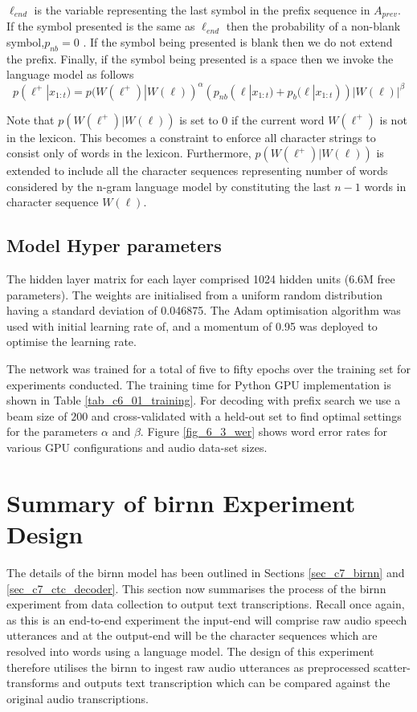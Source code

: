 $\ell_{end}$ is the variable representing the last symbol in the prefix sequence in $A_{prev}$. If the symbol presented is the same as $\ell_{end}$ then the probability of a non-blank symbol,$p_{nb}=0$ . If the symbol being presented is blank then we do not extend the prefix.  Finally, if the symbol being presented is a space then we invoke the language model as follows
\begin{equation}
p(\ell^+|x_{1:t})=p(W(\ell^+)|W(\ell))^\alpha(p_{nb}(\ell|x_{1:t})+p_b(\ell|x_{1:t}))|W(\ell)|^\beta
\label{eqn_c6_decoder03}
\end{equation}

Note that $p(W(\ell^+)|W(\ell))$ is set to $0$ if the current word $W(\ell^+)$ is not in the lexicon. This becomes a constraint to enforce all character strings to consist only of words in the lexicon.  Furthermore,  $p(W(\ell^+)|W(\ell))$ is extended to include all the character sequences representing number of words considered by the n-gram language model by constituting the last $n-1$ words in character sequence $W(\ell)$.

\subsection{Model Hyper parameters}
The hidden layer matrix for each layer comprised 1024 hidden units (6.6M free parameters).  The weights are initialised from a uniform random distribution having a standard deviation of 0.046875.  The Adam optimisation algorithm \citep{kingma2014adam} was used with initial learning rate of, and a momentum of 0.95 was deployed to optimise the learning rate.

The network was trained for a total of five to fifty epochs over the training set for experiments conducted. The training time for Python GPU implementation is shown in Table \ref{tab_c6_01_training}.  For decoding with prefix search we use a beam size of $200$ and cross-validated with a held-out set to find optimal settings for the parameters $\alpha$ and $\beta$. Figure \ref{fig_6_3_wer} shows word error rates for various GPU configurations and audio data-set sizes.

\startblue
\section{Summary of \acrshort{birnn} Experiment Design}
The details of the \acrshort{birnn} model has been outlined in Sections \ref{sec_c7_birnn} and \ref{sec_c7_ctc_decoder}.  This section now summarises the process of the \acrshort{birnn} experiment from data collection to output text transcriptions.  Recall once again, as this is an end-to-end experiment the input-end will comprise raw audio speech utterances and at the output-end will be the character sequences which are resolved into words using a language model. The design of this experiment therefore utilises the \acrshort{birnn} to ingest raw audio utterances as preprocessed scatter-transforms and outputs text transcription which can be compared against the original audio transcriptions.

